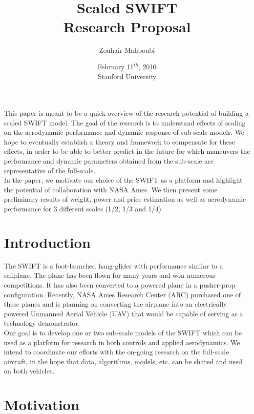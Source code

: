 \documentclass[titlepage,10pt]{article}
\begin{document}
\title{
Scaled SWIFT \\
Research Proposal
}

\author{Zouhair Mahboubi}

\date{February 11$^{th}$, 2010\\ Stanford University}

\maketitle
\newpage

\abstract
This paper is meant to be a quick overview of the research potential of building a scaled SWIFT model. The goal of the research is to understand effects of scaling on the aerodynamic performance and dynamic response of sub-scale models. We hope to eventually establish a theory and framework to compensate for these effects, in order to be able to better predict in the future for which maneuvers the performance and dynamic parameters obtained from the sub-scale are representative of the full-scale. \\

In the paper, we motivate our choice of the SWIFT as a platform and highlight the potential of collaboration with NASA Ames. We then present some preliminary results of weight, power and price estimation as well as aerodynamic performance for 3 different scales (1/2, 1/3 and 1/4) 

\newpage
\section{Introduction}
The SWIFT is a foot-launched hang-glider with performance similar to a sailplane. The plane has been flown for many years and won numerous competitions. It has also been converted to a powered plane in a pusher-prop configuration. Recently, NASA Ames Research Center (ARC) purchased one of these planes and is planning on converting the airplane into an electrically powered Unmanned Aerial Vehicle (UAV) that would be capable of serving as a technology demonstrator.\\
Our goal is to develop one or two sub-scale models of the SWIFT which can be used as a platform for research in both controls and applied aerodynamics. We intend to coordinate our efforts with the on-going research on the full-scale aircraft, in the hope that data, algorithms, models, etc. can be shared and used on both vehicles.

\section{Motivation}
\end{document}
